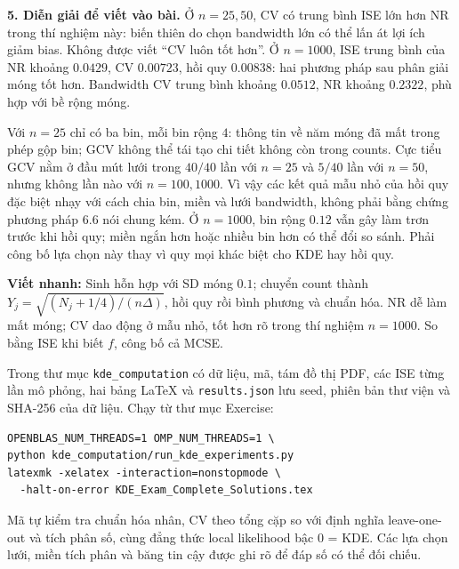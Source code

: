 \begin{solution}
\textbf{5. Diễn giải để viết vào bài.}
Ở $n=25,50$, CV có trung bình ISE lớn hơn NR trong thí nghiệm này: biến thiên do chọn bandwidth lớn có thể lấn át lợi ích giảm bias. Không được viết ``CV luôn tốt hơn''.
Ở $n=1000$, ISE trung bình của NR khoảng $0.0429$, CV $0.00723$, hồi quy $0.00838$: hai phương pháp sau phân giải móng tốt hơn. Bandwidth CV trung bình khoảng $0.0512$, NR khoảng $0.2322$, phù hợp với bề rộng móng.

Với $n=25$ chỉ có ba bin, mỗi bin rộng $4$: thông tin về năm móng đã mất trong phép gộp bin; GCV không thể tái tạo chi tiết không còn trong counts. Cực tiểu GCV nằm ở đầu mút lưới trong $40/40$ lần với $n=25$ và $5/40$ lần với $n=50$, nhưng không lần nào với $n=100,1000$. Vì vậy các kết quả mẫu nhỏ của hồi quy đặc biệt nhạy với cách chia bin, miền và lưới bandwidth, không phải bằng chứng phương pháp 6.6 nói chung kém.
Ở $n=1000$, bin rộng $0.12$ vẫn gây làm trơn trước khi hồi quy; miền ngắn hơn hoặc nhiều bin hơn có thể đổi so sánh. Phải công bố lựa chọn này thay vì quy mọi khác biệt cho KDE hay hồi quy.

\par\textbf{Viết nhanh:} Sinh hỗn hợp với SD móng $0.1$; chuyển count thành $Y_j=\sqrt{(N_j+1/4)/(n\Delta)}$, hồi quy rồi bình phương và chuẩn hóa. NR dễ làm mất móng; CV dao động ở mẫu nhỏ, tốt hơn rõ trong thí nghiệm $n=1000$. So bằng ISE khi biết $f$, công bố cả MCSE.
\end{solution}

\noindent Trong thư mục \texttt{kde\_computation} có dữ liệu, mã, tám đồ thị PDF, các ISE từng lần mô phỏng, hai bảng \LaTeX{} và \texttt{results.json} lưu seed, phiên bản thư viện và SHA-256 của dữ liệu. Chạy từ thư mục Exercise:
\begin{verbatim}
OPENBLAS_NUM_THREADS=1 OMP_NUM_THREADS=1 \
python kde_computation/run_kde_experiments.py
latexmk -xelatex -interaction=nonstopmode \
  -halt-on-error KDE_Exam_Complete_Solutions.tex
\end{verbatim}
Mã tự kiểm tra chuẩn hóa nhân, CV theo tổng cặp so với định nghĩa leave-one-out và tích phân số, cùng đẳng thức local likelihood bậc 0 = KDE. Các lựa chọn lưới, miền tích phân và băng tin cậy được ghi rõ để đáp số có thể đối chiếu.
